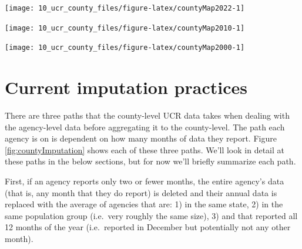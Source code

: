 \documentclass[
]{krantz}
\let\origfigure\figure
\let\endorigfigure\endfigure
\renewenvironment{figure}[1][2] {
    \expandafter\origfigure\expandafter[H]
} {
    \endorigfigure
}
\begin{document}
\begin{figure}

{\centering \texttt{[image: 10\_ucr\_county\_files/figure-latex/countyMap2022-1]} 

}

\caption{The share of the population in each county covered by an agency reporting 12 months of data based on their last month reported being December, 2022.}\label{fig:countyMap2022}
\end{figure}

\begin{figure}

{\centering \texttt{[image: 10\_ucr\_county\_files/figure-latex/countyMap2010-1]} 

}

\caption{The share of the population in each county covered by an agency reporting 12 months of data based on their last month reported being December, 2010.}\label{fig:countyMap2010}
\end{figure}

\begin{figure}

{\centering \texttt{[image: 10\_ucr\_county\_files/figure-latex/countyMap2000-1]} 

}

\caption{The share of the population in each county covered by an agency reporting 12 months of data based on their last month reported being December, 2000.}\label{fig:countyMap2000}
\end{figure}

\section{Current imputation
practices}\label{current-imputation-practices}

There are three paths that the county-level UCR data takes
when dealing with the agency-level data before aggregating
it to the county-level. The path each agency is on is
dependent on how many months of data they report. Figure
\ref{fig:countyImputation} shows each of these three paths.
We'll look in detail at these paths in the below sections,
but for now we'll briefly summarize each path.

First, if an agency reports only two or fewer months, the
entire agency's data (that is, any month that they do
report) is deleted and their annual data is replaced with
the average of agencies that are: 1) in the same state, 2)
in the same population group (i.e.~very roughly the same
size), 3) and that reported all 12 months of the year
(i.e.~reported in December but potentially not any other
month).
\end{document}
